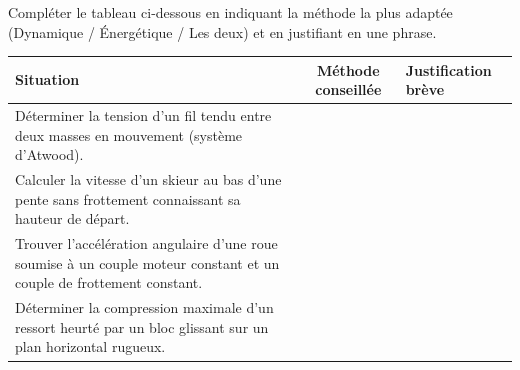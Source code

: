 \documentclass[11pt]{article}
\begin{document}
\begin{exercice}
Compléter le tableau ci-dessous en indiquant la méthode la plus adaptée (Dynamique / Énergétique / Les deux) et en justifiant en une phrase.

\begin{tabularx}{\linewidth}{|X|c|X|}
\hline
\textbf{Situation} & \textbf{Méthode conseillée} & \textbf{Justification brève} \\
\hline
Déterminer la tension d'un fil tendu entre deux masses en mouvement (système d'Atwood). & & \\
\hline
Calculer la vitesse d'un skieur au bas d'une pente sans frottement connaissant sa hauteur de départ. & & \\
\hline
Trouver l'accélération angulaire d'une roue soumise à un couple moteur constant et un couple de frottement constant. & & \\
\hline
Déterminer la compression maximale d'un ressort heurté par un bloc glissant sur un plan horizontal rugueux. & & \\
\hline
\end{tabularx}
\end{exercice}
\end{document}
